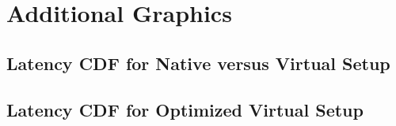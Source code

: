 \chapter{Additional Graphics}  \label{app:c}

\section{Latency CDF for Native versus Virtual Setup}

\clearpage
\section{Latency CDF for Optimized Virtual Setup}

